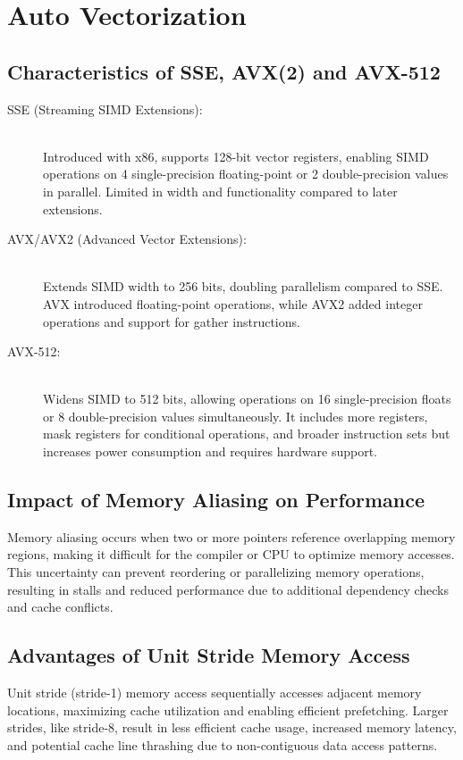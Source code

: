 \documentclass[../../main.tex]{subfiles}
\begin{document}
    \section{Auto Vectorization}
    \subsection{Characteristics of SSE, AVX(2) and AVX-512}

    \begin{description}
        \item[SSE (Streaming SIMD Extensions):] ~\\ Introduced with x86, supports 128-bit vector registers, enabling SIMD operations on 4 single-precision floating-point or 2 double-precision values in parallel. Limited in width and functionality compared to later extensions. \\
        \item[AVX/AVX2 (Advanced Vector Extensions):] ~\\ Extends SIMD width to 256 bits, doubling parallelism compared to SSE. AVX introduced floating-point operations, while AVX2 added integer operations and support for gather instructions. \\
        \item[AVX-512:] ~\\ Widens SIMD to 512 bits, allowing operations on 16 single-precision floats or 8 double-precision values simultaneously. It includes more registers, mask registers for conditional operations, and broader instruction sets but increases power consumption and requires hardware support. \\
    \end{description}

    \bigskip
    \subsection{Impact of Memory Aliasing on Performance}
    Memory aliasing occurs when two or more pointers reference overlapping memory regions, making it difficult for the compiler or CPU to optimize memory accesses. This uncertainty can prevent reordering or parallelizing memory operations, resulting in stalls and reduced performance due to additional dependency checks and cache conflicts.

    \bigskip
    \subsection{Advantages of Unit Stride Memory Access}
    Unit stride (stride-1) memory access sequentially accesses adjacent memory locations, maximizing cache utilization and enabling efficient prefetching. Larger strides, like stride-8, result in less efficient cache usage, increased memory latency, and potential cache line thrashing due to non-contiguous data access patterns.
\end{document}
